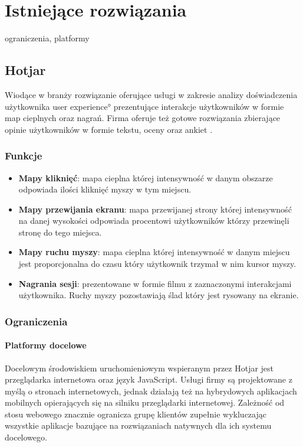 \section{Istniejące rozwiązania}
ograniczenia, platformy

\subsection{Hotjar}
Wiodące w branży rozwiązanie oferujące usługi w zakresie analizy doświadczenia użytkownika \ang{user experience} prezentujące interakcje użytkowników w formie map cieplnych oraz nagrań. Firma oferuje też gotowe rozwiązania zbierające opinie użytkowników w formie tekstu, oceny oraz ankiet \cite{Hotjar_website}.

\subsubsection{Funkcje}

\begin{itemize}
	\item {\bf Mapy kliknięć}: mapa cieplna której intensywność w danym obszarze odpowiada ilości kliknięć myszy w tym miejscu.
	\item {\bf Mapy przewijania ekranu}: mapa przewijanej strony której intensywność na danej wysokości odpowiada procentowi użytkowników którzy przewinęli stronę do tego miejsca.
	\item {\bf Mapy ruchu myszy}: mapa cieplna której intensywność w danym miejscu jest proporcjonalna do czasu który użytkownik trzymał w nim kursor myszy.
	\item {\bf Nagrania sesji}: prezentowane w formie filmu z zaznaczonymi interakcjami użytkownika. Ruchy myszy pozostawiają ślad który jest rysowany na ekranie.
\end{itemize}

\subsubsection{Ograniczenia} 

\paragraph{Platformy docelowe} 
Docelowym środowiskiem uruchomieniowym wspieranym przez Hotjar jest przeglądarka internetowa oraz język JavaScript. Usługi firmy są projektowane z myślą o stronach internetowych, jednak działają też na hybrydowych aplikacjach mobilnych opierających się na silniku przeglądarki internetowej. Zależność od stosu webowego znacznie ogranicza grupę klientów zupełnie wykluczając wszystkie aplikacje bazujące na rozwiązaniach natywnych dla ich systemu docelowego.


